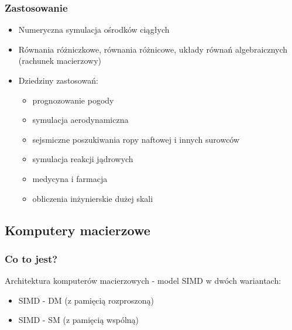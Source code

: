 		\subsubsection{Zastosowanie}
			\begin{itemize}
				\item Numeryczna symulacja ośrodków ciągłych
				\item Równania różniczkowe, równania różnicowe, układy równań algebraicznych (rachunek macierzowy)
				\item Dziedziny zastosowań:
				\begin{itemize}
					\item prognozowanie pogody
					\item symulacja aerodynamiczna
					\item sejsmiczne poszukiwania ropy naftowej i innych surowców
					\item symulacja reakcji jądrowych
					\item medycyna i farmacja
					\item obliczenia inżynierskie dużej skali
				\end{itemize}
			\end{itemize}
	
	\subsection{Komputery macierzowe}
		\subsubsection{Co to jest?}
			Architektura komputerów macierzowych - model SIMD w dwóch wariantach:
			\begin{itemize}
				\item SIMD - DM (z pamięcią rozproszoną)
				\item SIMD - SM (z pamięcią wspólną)
			\end{itemize}
		
